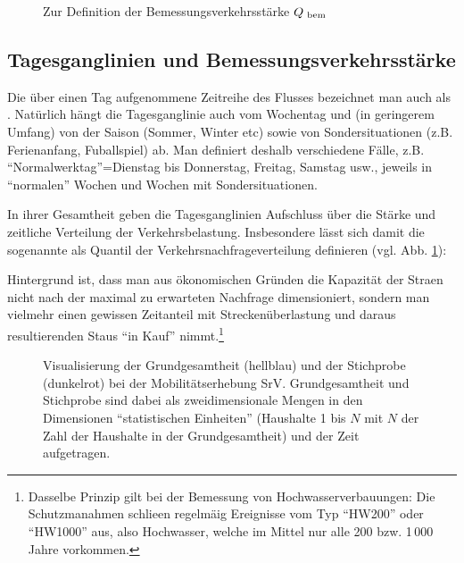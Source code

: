 \begin{figure}
\caption{\label{fig:bemessungsverkehrsstaerke}Zur Definition der
Bemessungsverkehrsst\"arke $Q_{{\mbox{ {\scriptsize \hspace{-0.2ex}bem}}}}$
}
\end{figure}

\subsection{Tagesganglinien und Bemessungsverkehrsst\"arke}

Die \"uber einen Tag aufgenommene Zeitreihe des Flusses bezeichnet man
auch als . Nat\"urlich h\"angt
die Tagesganglinie auch vom Wochentag und (in geringerem Umfang) 
von der Saison (Sommer, Winter etc) sowie von Sondersituationen
(z.B. Ferienanfang, Fu\3ballspiel) ab. Man definiert deshalb
verschiedene F\"alle, z.B. ``Normalwerktag''=Dienstag bis Donnerstag,
Freitag, Samstag usw., jeweils in ``normalen'' Wochen und Wochen mit
Sondersituationen. 

In ihrer Gesamtheit geben die Tagesganglinien 
 Aufschluss \"uber die St\"arke und
zeitliche Verteilung der Verkehrsbelastung. Insbesondere l\"asst sich
damit die sogenannte  als Quantil
der Verkehrsnachfrageverteilung definieren
(vgl. Abb. \ref{fig:bemessungsverkehrsstaerke}): 


Hintergrund ist, dass man aus
\"okonomischen Gr\"unden die Kapazit\"at der Stra\3en nicht nach der
maximal zu erwarteten Nachfrage dimensioniert, sondern man vielmehr
einen  gewissen Zeitanteil mit
Strecken\"uberlastung und daraus resultierenden Staus ``in Kauf''
nimmt.\footnote{Dasselbe Prinzip gilt bei der Bemessung von
Hochwasserverbauungen: Die Schutzma\3nahmen schlie\3en regelm\"a\3ig
Ereignisse vom Typ ``HW200'' oder ``HW1000'' aus, also Hochwasser, welche im Mittel
nur alle 200 bzw. 1\,000 Jahre vorkommen.}






\begin{figure}[h!]
\caption{\label{fig:SrV-Stichprobe}Visualisierung der 
Grund\-gesamtheit (hellblau) und der Stichprobe (dunkelrot)
bei der Mobilit\"atserhebung SrV. Grund\-gesamtheit und
Stichprobe sind dabei als zweidimensionale Mengen in den Dimensionen
``statistischen Einheiten'' (Haushalte 1 bis $N$ mit $N$ der Zahl der
Haushalte in der Grund\-gesamtheit) und der Zeit aufgetragen.
}
\end{figure}

